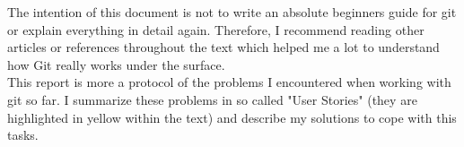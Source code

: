 The intention of this document is not to write an absolute beginners guide for git or explain everything in detail again. 
Therefore, I recommend reading other articles or references throughout the text which helped me a lot to understand how Git really
works under the surface. 
\\
This report is more a protocol of 
the problems I encountered when working with git so far. I summarize these problems in so called "User Stories"
(they are highlighted in yellow within the text) and describe my solutions to cope with this tasks.

